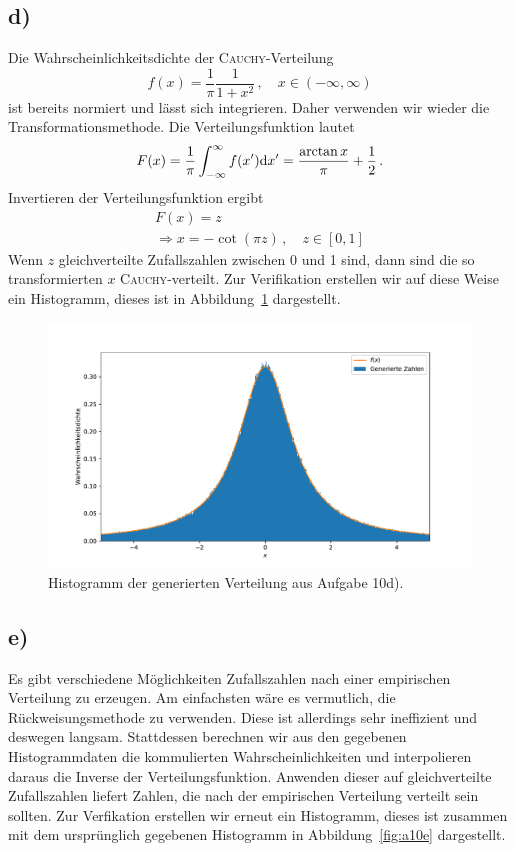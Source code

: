 \documentclass[a4paper, 11pt]{article}
\begin{document}
\subsection*{d)}
Die Wahrscheinlichkeitsdichte der \textsc{Cauchy}-Verteilung
\begin{equation}
    f(x) = \frac{1}{\pi}\frac{1}{1 + x^2}\,, \quad x \in (-\infty, \infty)
\end{equation}
ist bereits normiert und lässt sich integrieren. Daher verwenden wir wieder die Transformationsmethode. Die Verteilungsfunktion lautet
\begin{equation}
    F(x) = \frac{1}{\pi} \int_{-\infty}^{\infty} f(x') \textup{d}x' = \frac{\arctan{x}}{\pi} + \frac{1}{2}\,.
\end{equation}
Invertieren der Verteilungsfunktion ergibt
\begin{gather}
    F(x) = z \\
    \Rightarrow x = -\cot(\pi z)\,, \quad z \in [0, 1]
\end{gather}
Wenn $z$ gleichverteilte Zufallszahlen zwischen 0 und 1 sind, dann sind die so transformierten $x$ \textsc{Cauchy}-verteilt. Zur Verifikation erstellen wir auf diese Weise ein Histogramm, dieses ist in Abbildung~\ref{fig:a10d} dargestellt. 
\begin{figure}
    \centering
    \includegraphics[width=\textwidth]{../A10/A10d.pdf}
    \caption{Histogramm der generierten Verteilung aus Aufgabe 10d).}
    \label{fig:a10d}
\end{figure}
\FloatBarrier

\subsection*{e)}
Es gibt verschiedene Möglichkeiten Zufallszahlen nach einer empirischen Verteilung zu erzeugen. Am einfachsten wäre es vermutlich, die Rückweisungsmethode zu verwenden. Diese ist allerdings sehr ineffizient und deswegen langsam. Stattdessen berechnen wir aus den gegebenen Histogrammdaten die kommulierten Wahrscheinlichkeiten und interpolieren daraus die Inverse der Verteilungsfunktion. Anwenden dieser auf gleichverteilte Zufallszahlen liefert Zahlen, die nach der empirischen Verteilung verteilt sein sollten. Zur Verfikation erstellen wir erneut ein Histogramm, dieses ist zusammen mit dem ursprünglich gegebenen Histogramm in Abbildung~\ref{fig:a10e} dargestellt.
\end{document}
